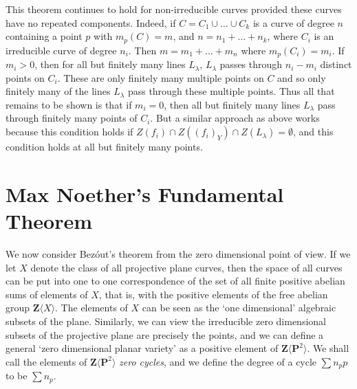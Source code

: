 \begin{remark}
    This theorem continues to hold for non-irreducible curves provided these curves have no repeated components. Indeed, if $C = C_1 \cup \dots \cup C_k$ is a curve of degree $n$ containing a point $p$ with $m_p(C) = m$, and $n = n_1 + \dots + n_k$, where $C_i$ is an irreducible curve of degree $n_i$. Then $m = m_1 + \dots + m_n$ where $m_p(C_i) = m_i$. If $m_i > 0$, then for all but finitely many lines $L_\lambda$, $L_\lambda$ passes through $n_i - m_i$ distinct points on $C_i$. These are only finitely many multiple points on $C$ and so only finitely many of the lines $L_\lambda$ pass through these multiple points. Thus all that remains to be shown is that if $m_i = 0$, then all but finitely many lines $L_\lambda$ pass through finitely many points of $C_i$. But a similar approach as above works because this condition holds if $Z(f_i) \cap Z((f_i)_Y) \cap Z(L_\lambda) = \emptyset$, and this condition holds at all but finitely many points.
\end{remark}

\section{Max Noether's Fundamental Theorem}

We now consider Bez\'{o}ut's theorem from the zero dimensional point of view. If we let $X$ denote the class of all projective plane curves, then the space of all curves can be put into one to one correspondence of the set of all finite positive abelian sums of elements of $X$, that is, with the positive elements of the free abelian group $\mathbf{Z}\langle X \rangle$. The elements of $X$ can be seen as the `one dimensional' algebraic subsets of the plane. Similarly, we can view the irreducible zero dimensional subsets of the projective plane are precisely the points, and we can define a general `zero dimensional planar variety' as a positive element of $\mathbf{Z} \langle \mathbf{P}^2 \rangle$. We shall call the elements of $\mathbf{Z} \langle \mathbf{P}^2 \rangle$ \emph{zero cycles}, and we define the degree of a cycle $\sum n_p p$ to be $\sum n_p$.


